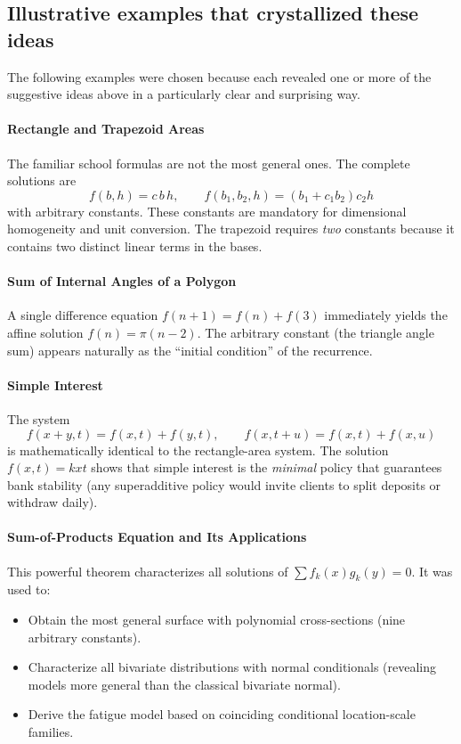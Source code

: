 \subsection{Illustrative examples that crystallized these ideas}

The following examples were chosen because each revealed one or more of the suggestive ideas above in a particularly clear and surprising way.

\paragraph{Rectangle and Trapezoid Areas}
The familiar school formulas are not the most general ones. The complete solutions are
\[
f(b,h)=c\,b\,h, \qquad f(b_1,b_2,h)=(b_1+c_1 b_2)c_2 h
\]
with arbitrary constants. These constants are mandatory for dimensional homogeneity and unit conversion. The trapezoid requires \emph{two} constants because it contains two distinct linear terms in the bases.

\paragraph{Sum of Internal Angles of a Polygon}
A single difference equation $f(n+1)=f(n)+f(3)$ immediately yields the affine solution $f(n)=\pi(n-2)$. The arbitrary constant (the triangle angle sum) appears naturally as the ``initial condition'' of the recurrence.

\paragraph{Simple Interest}
The system
\[
f(x+y,t)=f(x,t)+f(y,t), \qquad f(x,t+u)=f(x,t)+f(x,u)
\]
is mathematically identical to the rectangle-area system. The solution $f(x,t)=kxt$ shows that simple interest is the \emph{minimal} policy that guarantees bank stability (any superadditive policy would invite clients to split deposits or withdraw daily).

\paragraph{Sum-of-Products Equation and Its Applications}
This powerful theorem characterizes all solutions of $\sum f_k(x)g_k(y)=0$. It was used to:
\begin{itemize}
\item Obtain the most general surface with polynomial cross-sections (nine arbitrary constants).
\item Characterize all bivariate distributions with normal conditionals (revealing models more general than the classical bivariate normal).
\item Derive the fatigue model based on coinciding conditional location-scale families.
\end{itemize}

